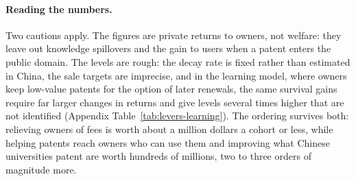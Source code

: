 

\paragraph{Reading the numbers.} Two cautions apply. The figures are private returns to owners, not welfare: they
leave out knowledge spillovers and the gain to users when a patent enters the public domain. The levels are rough: the
decay rate is fixed rather than estimated in China, the sale targets are imprecise, and in the learning model, where
owners keep low-value patents for the option of later renewals, the same survival gains require far larger changes in
returns and give levels several times higher that are not identified (Appendix Table~\ref{tab:levers-learning}). The ordering survives both: relieving owners of fees is worth
about a million dollars a cohort or less, while helping patents reach owners who can use them and improving what Chinese
universities patent are worth hundreds of millions, two to three orders of magnitude more.
